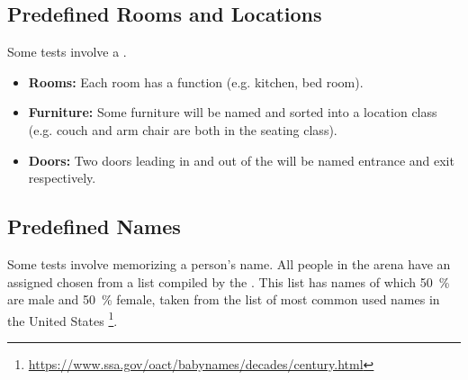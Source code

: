 \subsection{Predefined Rooms and Locations}
\textit{\label{sec:rules:scenario:locations}}
Some tests involve a \PredefinedLocation{}.
\begin{itemize}
	\item \textbf{Rooms:} Each room has a function (e.g. kitchen, bed room).
	
	\item \textbf{Furniture:} Some furniture will be named and sorted into a location class (e.g. couch and arm chair are both in the seating class). 
	
	\item \textbf{Doors:} Two doors leading in and out of the \Arena{} will be named entrance and exit respectively.
\end{itemize}


\subsection{Predefined Names}
\label{sec:rules:scenario:names}
Some tests involve memorizing a person's name. All people in the arena have an assigned \PredefinedName{} chosen from a list compiled by the \TC{}. This list has \NumNames{} names of which \SI{50}{\percent} are male and \SI{50} {\percent} female,
taken from the list of most common used names in the United States \footnote{\url{https://www.ssa.gov/oact/babynames/decades/century.html}}.







